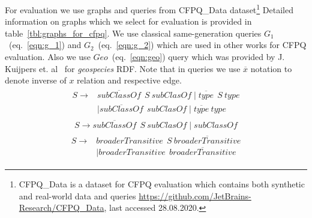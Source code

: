 For evaluation we use graphs and queries from CFPQ\_Data dataset\footnote{CFPQ\_Data is a dataset for CFPQ evaluation which contains both synthetic and real-world data and queries \url{https://github.com/JetBrains-Research/CFPQ\_Data}, last accessed 28.08.2020.}
Detailed information on graphs which we select for evaluation is provided in table~\ref{tbl:graphs_for_cfpq}.
We use classical same-generation queries $G_1$~(eq.~\ref{eqn:g_1}) and $G_2$~(eq.~\ref{eqn:g_2}) which are used in other works for CFPQ evaluation. 
Also we use $Geo$~(eq.~\ref{eqn:geo}) query which was provided by J. Kuijpers et. al~\cite{Kuijpers:2019:ESC:3335783.3335791} for \textit{geospecies} RDF.
Note that in queries we use $\overline{x}$ notation to denote inverse of $x$ relation and respective edge.
\begin{align}
\begin{split}
\label{eqn:g_1}
S \to & \overline{\textit{subClassOf}} \ \ S \ \textit{subClasOf} \mid \overline{\textit{type}} \ \ S \ \textit{type}\\   & \mid \overline{\textit{subClassOf}} \ \ \textit{subClasOf} \mid \overline{\textit{type}} \ \textit{type}
\end{split}
\end{align}
\begin{align}
\label{eqn:g_2}
S \to \overline{\textit{subClassOf}} \ \ S \ \textit{subClasOf} \mid \textit{subClassOf}
\end{align}
\begin{align}
\begin{split}
\label{eqn:geo}
S \to & \textit{broaderTransitive} \ \  S \ \overline{\textit{broaderTransitive}} \\
      & \mid \textit{broaderTransitive} \ \  \overline{\textit{broaderTransitive}}
\end{split}
\end{align}

